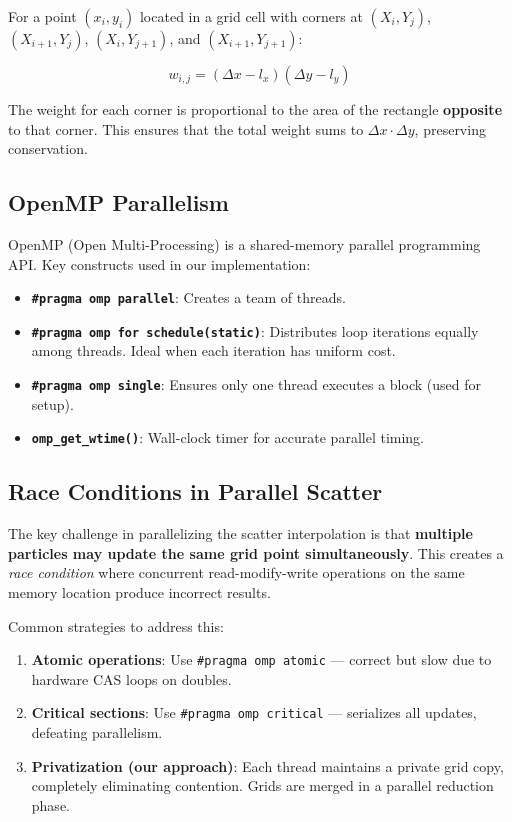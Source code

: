 \documentclass[12pt,a4paper]{article}
\begin{document}
For a point $(x_i, y_i)$ located in a grid cell with corners at $(X_i, Y_j)$, $(X_{i+1}, Y_j)$, $(X_i, Y_{j+1})$, and $(X_{i+1}, Y_{j+1})$:

\[
w_{i,j} = (\Delta x - l_x)(\Delta y - l_y)
\]

The weight for each corner is proportional to the area of the rectangle \textbf{opposite} to that corner. This ensures that the total weight sums to $\Delta x \cdot \Delta y$, preserving conservation.

\subsection{OpenMP Parallelism}

OpenMP (Open Multi-Processing) is a shared-memory parallel programming API. Key constructs used in our implementation:

\begin{itemize}
    \item \textbf{\texttt{\#pragma omp parallel}}: Creates a team of threads.
    \item \textbf{\texttt{\#pragma omp for schedule(static)}}: Distributes loop iterations equally among threads. Ideal when each iteration has uniform cost.
    \item \textbf{\texttt{\#pragma omp single}}: Ensures only one thread executes a block (used for setup).
    \item \textbf{\texttt{omp\_get\_wtime()}}: Wall-clock timer for accurate parallel timing.
\end{itemize}

\subsection{Race Conditions in Parallel Scatter}

The key challenge in parallelizing the scatter interpolation is that \textbf{multiple particles may update the same grid point simultaneously}. This creates a \textit{race condition} where concurrent read-modify-write operations on the same memory location produce incorrect results.

Common strategies to address this:
\begin{enumerate}
    \item \textbf{Atomic operations}: Use \texttt{\#pragma omp atomic} — correct but slow due to hardware CAS loops on doubles.
    \item \textbf{Critical sections}: Use \texttt{\#pragma omp critical} — serializes all updates, defeating parallelism.
    \item \textbf{Privatization (our approach)}: Each thread maintains a private grid copy, completely eliminating contention. Grids are merged in a parallel reduction phase.
\end{enumerate}
\end{document}
